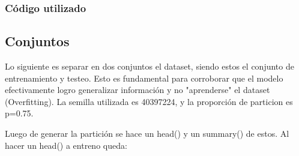 \subsubsection{Código utilizado}

\subsection{Conjuntos}
Lo siguiente es separar en dos conjuntos el dataset, siendo estos el conjunto de entrenamiento y testeo. Esto es fundamental para corroborar que el modelo efectivamente logro generalizar información y no "aprenderse" el dataset (Overfitting).
La semilla utilizada es 40397224, y la proporción de particion es p=0.75.

Luego de generar la partición se hace un head() y un summary() de estos.
Al hacer un head() a entreno queda:

